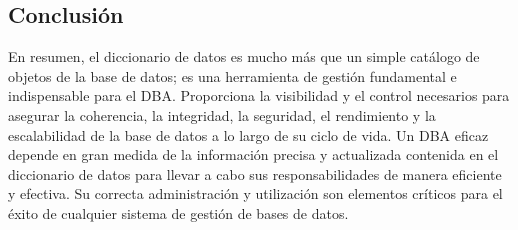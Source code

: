 \subsection{Conclusión}

En resumen, el diccionario de datos es mucho más que un simple catálogo de objetos de la base de datos; es una herramienta de gestión fundamental e indispensable para el DBA. Proporciona la visibilidad y el control necesarios para asegurar la coherencia, la integridad, la seguridad, el rendimiento y la escalabilidad de la base de datos a lo largo de su ciclo de vida.  Un DBA eficaz depende en gran medida de la información precisa y actualizada contenida en el diccionario de datos para llevar a cabo sus responsabilidades de manera eficiente y efectiva. Su correcta administración y utilización son elementos críticos para el éxito de cualquier sistema de gestión de bases de datos.
